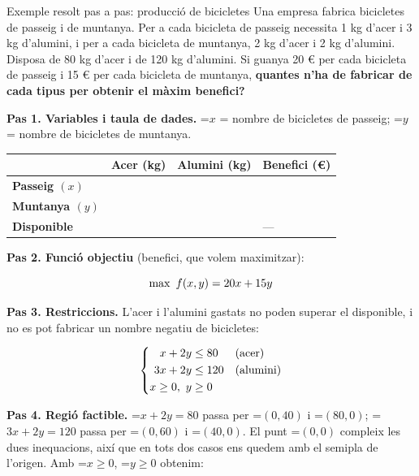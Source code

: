 \documentclass[11pt,a4paper]{article}
\newcommand{\fmm}[1]{\setbox0=\hbox{$#1$}\ifdim\wd0>\linewidth\fmdisp{#1}\else\mbox{\box0}\fi}
\newcommand{\fmdisp}[1]{\[\setbox2=\hbox{$\displaystyle #1$}\ifdim\wd2>\linewidth\resizebox{\linewidth}{!}{\box2}\else\box2\fi\]}
\begin{document}
\begin{fmex}{Exemple resolt pas a pas: producció de bicicletes}
Una empresa fabrica bicicletes de passeig i de muntanya. Per a cada bicicleta de passeig necessita 1 kg d'acer i 3 kg d'alumini, i per a cada bicicleta de muntanya, 2 kg d'acer i 2 kg d'alumini. Disposa de 80 kg d'acer i de 120 kg d'alumini. Si guanya 20 € per cada bicicleta de passeig i 15 € per cada bicicleta de muntanya, \textbf{quantes n'ha de fabricar de cada tipus per obtenir el màxim benefici?}

\textbf{Pas 1. Variables i taula de dades.} \fmm{x} = nombre de bicicletes de passeig; \fmm{y} = nombre de bicicletes de muntanya.

\begin{center}\renewcommand{\arraystretch}{1.5}\small\begin{tabularx}{\linewidth}{>{\raggedright\arraybackslash}p{3.2cm}>{\raggedright\arraybackslash}X>{\raggedright\arraybackslash}X>{\raggedright\arraybackslash}X}\toprule
\textbf{} & \textbf{Acer (kg)} & \textbf{Alumini (kg)} & \textbf{Benefici (€)}\\\midrule
\textbf{Passeig $(x)$} & 1 & 3 & 20\\[3pt]
\textbf{Muntanya $(y)$} & 2 & 2 & 15\\[3pt]
\textbf{Disponible} & 80 & 120 & —\\[3pt]
\bottomrule\end{tabularx}\end{center}

\textbf{Pas 2. Funció objectiu} (benefici, que volem maximitzar):

\fmdisp{\max\ f(x,y)=20x+15y}

\textbf{Pas 3. Restriccions.} L'acer i l'alumini gastats no poden superar el disponible, i no es pot fabricar un nombre negatiu de bicicletes:

\fmdisp{\left\{\begin{aligned}x+2y&\leq80 &&\text{(acer)}\\ 3x+2y&\leq120 &&\text{(alumini)}\\ x\geq0,\ y&\geq0\end{aligned}\right.}

\textbf{Pas 4. Regió factible.} \fmm{x+2y=80} passa per \fmm{(0,40)} i \fmm{(80,0)}; \fmm{3x+2y=120} passa per \fmm{(0,60)} i \fmm{(40,0)}. El punt \fmm{(0,0)} compleix les dues inequacions, així que en tots dos casos ens quedem amb el semipla de l'origen. Amb \fmm{x\geq0}, \fmm{y\geq0} obtenim:


\end{fmex}
\end{document}
